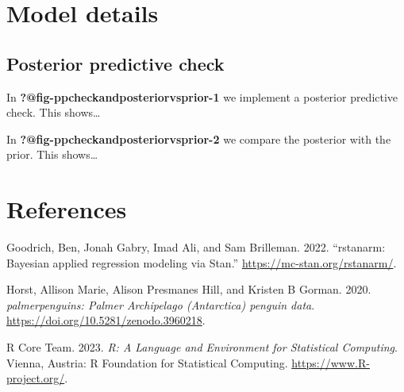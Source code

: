 \documentclass[
  letterpaper,
  DIV=11,
  numbers=noendperiod]{scrartcl}
\newlength{\cslhangindent}
\newenvironment{CSLReferences}[2] %
 {\begin{list}{}{%
  \setlength{\itemindent}{0pt}
  \setlength{\leftmargin}{0pt}
  \setlength{\parsep}{0pt}
  \ifodd #1
   \setlength{\leftmargin}{\cslhangindent}
   \setlength{\itemindent}{-1\cslhangindent}
  \fi
  \setlength{\itemsep}{#2\baselineskip}}}
 {\end{list}}
\begin{document}
\section{Model details}\label{sec-model-details}

\subsection{Posterior predictive
check}\label{posterior-predictive-check}

In \textbf{?@fig-ppcheckandposteriorvsprior-1} we implement a posterior
predictive check. This shows\ldots{}

In \textbf{?@fig-ppcheckandposteriorvsprior-2} we compare the posterior
with the prior. This shows\ldots{}

\newpage

\section*{References}\label{references}

\label{refs}
\begin{CSLReferences}{1}{0}
Goodrich, Ben, Jonah Gabry, Imad Ali, and Sam Brilleman. 2022.
{``{rstanarm: {Bayesian} applied regression modeling via {Stan}}.''}
\url{https://mc-stan.org/rstanarm/}.

Horst, Allison Marie, Alison Presmanes Hill, and Kristen B Gorman. 2020.
\emph{{palmerpenguins: Palmer Archipelago (Antarctica) penguin data}}.
\url{https://doi.org/10.5281/zenodo.3960218}.

R Core Team. 2023. \emph{{R: A Language and Environment for Statistical
Computing}}. Vienna, Austria: R Foundation for Statistical Computing.
\url{https://www.R-project.org/}.

\end{CSLReferences}
\end{document}
